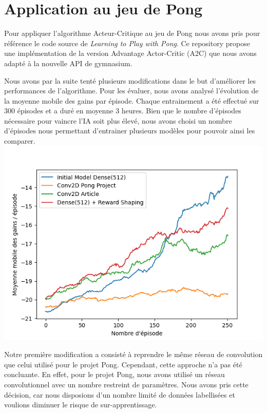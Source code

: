 \section{Application au jeu de Pong}

Pour appliquer l'algorithme Acteur-Critique au jeu de Pong nous avons pris pour référence le code source
de \emph{Learning to Play with Pong}\cite{PongGithub}. Ce repository propose une implémentation de la version Advantage Actor-Critic (A2C)
que nous avons adapté à la nouvelle API de gymnasium.

Nous avons par la suite tenté plusieurs modifications dans le but d'améliorer les performances de l'algorithme.
Pour les évaluer, nous avons analysé l'évolution de la moyenne mobile des gains par épisode.
Chaque entrainement a été effectué sur 300 épisodes et a duré en moyenne 3 heures. Bien que le nombre d'épisodes nécessaire
pour vaincre l'IA soit plus élevé, nous avons choisi  un nombre d'épisodes nous permettant d'entrainer plusieurs modèles pour pouvoir ainsi les comparer.
\includegraphics[width=\linewidth]{rolling_average_graph.png}

\par Notre première modification a consisté à reprendre le même réseau de convolution que celui utilisé pour le projet Pong. 
Cependant, cette approche n'a pas été concluante. 
En effet, pour le projet Pong, nous avons utilisé un réseau convolutionnel avec un nombre restreint de 
paramètres. Nous avons pris cette décision, car nous disposions d'un nombre limité de données labellisées 
et voulions diminuer le risque de sur-apprentissage. 

